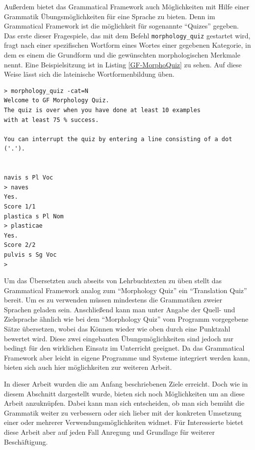 Außerdem bietet das Grammatical Framework auch Möglichkeiten mit Hilfe einer Grammatik Übungsmöglichkeiten für eine Sprache zu bieten. Denn im Grammatical Framework ist die möglichkeit für sogenannte ``Quizes'' gegeben. Das erste dieser Fragespiele, das mit dem Befehl \texttt{morphology\_quiz} gestartet wird, fragt nach einer spezifischen Wortform eines Wortes einer gegebenen Kategorie, in dem es einem die Grundform und die gewünschten morphologischen Merkmale nennt. Eine Beispielsitzung ist in Listing \ref{GF-MorphoQuiz} zu sehen. Auf diese Weise lässt sich die lateinische Wortformenbildung üben.
\begin{lstlisting}[float=h!tp,caption={Eine Beispielsitzung des Grammatical Framework Morphology Quiz},label={GF-MorphoQuiz},basicstyle=\small]
> morphology_quiz -cat=N
Welcome to GF Morphology Quiz.
The quiz is over when you have done at least 10 examples
with at least 75 % success.

You can interrupt the quiz by entering a line consisting of a dot ('.').


navis s Pl Voc
> naves
Yes.
Score 1/1
plastica s Pl Nom
> plasticae
Yes.
Score 2/2
pulvis s Sg Voc
>
\end{lstlisting}
Um das Übersetzten auch abseits von Lehrbuchtexten zu üben stellt das Grammatical Framework analog zum ``Morphology Quiz'' ein ``Translation Quiz'' bereit. Um es zu verwenden müssen mindestens die Grammatiken zweier Sprachen geladen sein. Anschließend kann man unter Angabe der Quell- und Zielsprache ähnlich wie bei dem ``Morphology Quiz'' vom Programm vorgegebene Sätze übersetzen, wobei das Können wieder wie oben durch eine Punktzahl bewertet wird. Diese zwei eingebauten Übungsmöglichkeiten sind jedoch nur bedingt für den wirklichen Einsatz im Unterricht geeignet. Da das Grammatical Framework aber leicht in eigene Programme und Systeme integriert werden kann, bieten sich auch hier möglichkeiten zur weiteren Arbeit.\par
In dieser Arbeit wurden die am Anfang beschriebenen Ziele erreicht. Doch wie in diesem Abschnitt dargestellt wurde, bieten sich noch Möglichkeiten um an diese Arbeit anzuknüpfen. Dabei kann man sich entscheiden, ob man sich bemüht die Grammatik weiter zu verbessern oder sich lieber mit der konkreten Umsetzung einer oder mehrerer Verwendungsmöglichkeiten widmet. Für Interessierte bietet diese Arbeit aber auf jeden Fall Anregung und Grundlage für weiterer Beschäftigung.